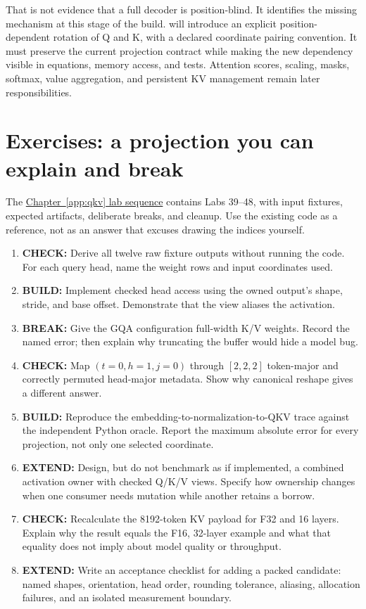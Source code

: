 That is not evidence that a full decoder is position-blind. It
identifies the missing mechanism at this stage of the build. 
will introduce an explicit position-dependent rotation of Q and K, with
a declared coordinate pairing convention. It must preserve the current
projection contract while making the new dependency visible in
equations, memory access, and tests. Attention scores, scaling, masks,
softmax, value aggregation, and persistent KV management remain later
responsibilities.

\section{Exercises: a projection you can explain and
break}\label{exercises-a-projection-you-can-explain-and-break}

The
\href{https://github.com/hermonai/inside-the-llm-engine/blob/astra-visual-rewrite/labs/lab-39-qkv-projection-workbench.md}{Chapter~\ref{app:qkv} lab sequence} contains Labs 39--48, with input fixtures, expected
artifacts, deliberate breaks, and cleanup. Use the existing code as a
reference, not as an answer that excuses drawing the indices yourself.

\begin{enumerate}
\def\labelenumi{\arabic{enumi}.}
\tightlist
\item
  \textbf{CHECK:} Derive all twelve raw fixture outputs without running
  the code. For each query head, name the weight rows and input
  coordinates used.
\item
  \textbf{BUILD:} Implement checked head access using the owned output's
  shape, stride, and base offset. Demonstrate that the view aliases the
  activation.
\item
  \textbf{BREAK:} Give the GQA configuration full-width K/V weights.
  Record the named error; then explain why truncating the buffer would
  hide a model bug.
\item
  \textbf{CHECK:} Map \((t=0,h=1,j=0)\) through \([2,2,2]\) token-major
  and correctly permuted head-major metadata. Show why canonical reshape
  gives a different answer.
\item
  \textbf{BUILD:} Reproduce the embedding-to-normalization-to-QKV trace
  against the independent Python oracle. Report the maximum absolute
  error for every projection, not only one selected coordinate.
\item
  \textbf{EXTEND:} Design, but do not benchmark as if implemented, a
  combined activation owner with checked Q/K/V views. Specify how
  ownership changes when one consumer needs mutation while another
  retains a borrow.
\item
  \textbf{CHECK:} Recalculate the 8192-token KV payload for F32 and 16
  layers. Explain why the result equals the F16, 32-layer example and
  what that equality does not imply about model quality or throughput.
\item
  \textbf{EXTEND:} Write an acceptance checklist for adding a packed
  candidate: named shapes, orientation, head order, rounding tolerance,
  aliasing, allocation failures, and an isolated measurement boundary.
\end{enumerate}

